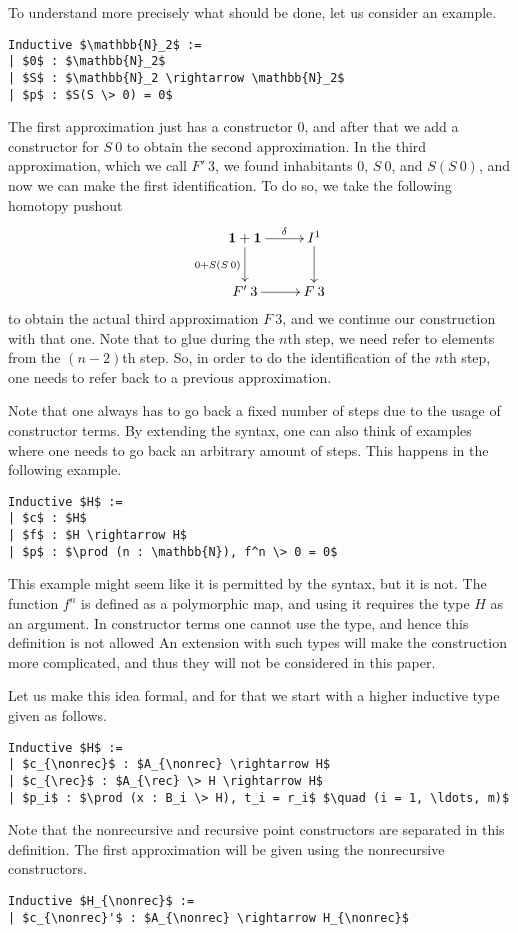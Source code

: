 \documentclass[a4paper,UKenglish]{lipics-v2016}
\newcommand{\one}[0]{\textbf{1}}
\newcommand{\rec}[0]{\operatorname{rec}}
\newcommand{\nonrec}[0]{\operatorname{nonrec}}
\begin{document}
To understand more precisely what should be done, let us consider an example.
\lstset{language=Coq}
\begin{lstlisting}
Inductive $\mathbb{N}_2$ :=
| $0$ : $\mathbb{N}_2$
| $S$ : $\mathbb{N}_2 \rightarrow \mathbb{N}_2$
| $p$ : $S(S \> 0) = 0$
\end{lstlisting}
The first approximation just has a constructor $0$, and after that we add a constructor for $S \> 0$ to obtain the second approximation.
In the third approximation, which we call $F' \> 3$, we found inhabitants $0$, $S \> 0$, and $S(S \> 0)$, and now we can make the first identification.
To do so, we take the following homotopy pushout
\[
\xymatrix
{
	\one + \one \ar[d]_{0 + S(S \> 0)} \ar[r]^-{\delta} & I^1 \ar[d]\\
	F' \> 3\ar[r] & F \> 3
}
\]
to obtain the actual third approximation $F \> 3$, and we continue our construction with that one.
Note that to glue during the $n$th step, we need refer to elements from the $(n-2)$th step.
So, in order to do the identification of the $n$th step, one needs to refer back to a previous approximation.

Note that one always has to go back a fixed number of steps due to the usage of constructor terms.
By extending the syntax, one can also think of examples where one needs to go back an arbitrary amount of steps.
This happens in the following example.
\lstset{language=Coq}
\begin{lstlisting}
Inductive $H$ :=
| $c$ : $H$
| $f$ : $H \rightarrow H$
| $p$ : $\prod (n : \mathbb{N}), f^n \> 0 = 0$
\end{lstlisting}
This example might seem like it is permitted by the syntax, but it is not.
The function $f^n$ is defined as a polymorphic map, and using it requires the type $H$ as an argument.
In constructor terms one cannot use the type, and hence this definition is not allowed
An extension with such types will make the construction more complicated, and thus they will not be considered in this paper.

Let us make this idea formal, and for that we start with a higher inductive type given as follows.
\lstset{language=Coq}
\begin{lstlisting}[label={lst:HIT}]
Inductive $H$ :=
| $c_{\nonrec}$ : $A_{\nonrec} \rightarrow H$
| $c_{\rec}$ : $A_{\rec} \> H \rightarrow H$
| $p_i$ : $\prod (x : B_i \> H), t_i = r_i$ $\quad (i = 1, \ldots, m)$
\end{lstlisting}
Note that the nonrecursive and recursive point constructors are separated in this definition.
The first approximation will be given using the nonrecursive constructors.
\lstset{language=Coq}
\begin{lstlisting}
Inductive $H_{\nonrec}$ :=
| $c_{\nonrec}'$ : $A_{\nonrec} \rightarrow H_{\nonrec}$
\end{lstlisting}
\end{document}
